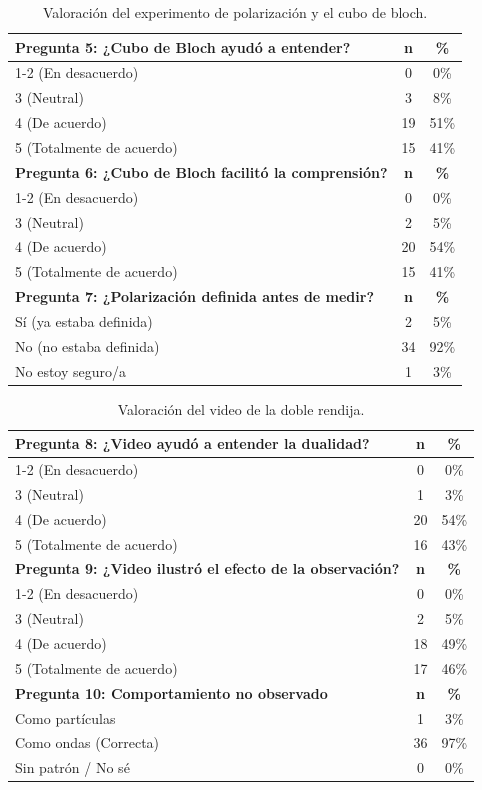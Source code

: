 \documentclass[10pt,a4paper]{article}
\begin{document}
\begin{table}[h!]
\centering
\caption{Valoración del experimento de polarización y el cubo de bloch.}
\begin{tabular}{|l|c|c|}
\hline
\textbf{Pregunta 5: ¿Cubo de Bloch ayudó a entender?} & \textbf{n} & \textbf{\%} \\
\hline
1-2 (En desacuerdo) & 0 & 0\% \\
3 (Neutral) & 3 & 8\% \\
4 (De acuerdo) & 19 & 51\% \\
5 (Totalmente de acuerdo) & 15 & 41\% \\
\hline
\textbf{Pregunta 6: ¿Cubo de Bloch facilitó la comprensión?} & \textbf{n} & \textbf{\%} \\
\hline
1-2 (En desacuerdo) & 0 & 0\% \\
3 (Neutral) & 2 & 5\% \\
4 (De acuerdo) & 20 & 54\% \\
5 (Totalmente de acuerdo) & 15 & 41\% \\
\hline
\textbf{Pregunta 7: ¿Polarización definida antes de medir?} & \textbf{n} & \textbf{\%} \\
\hline
Sí (ya estaba definida) & 2 & 5\% \\
No (no estaba definida) & 34 & 92\% \\
No estoy seguro/a & 1 & 3\% \\
\hline
\end{tabular}
\end{table}

\begin{table}[h!]
\centering
\caption{Valoración del video de la doble rendija.}
\begin{tabular}{|l|c|c|}
\hline
\textbf{Pregunta 8: ¿Video ayudó a entender la dualidad?} & \textbf{n} & \textbf{\%} \\
\hline
1-2 (En desacuerdo) & 0 & 0\% \\
3 (Neutral) & 1 & 3\% \\
4 (De acuerdo) & 20 & 54\% \\
5 (Totalmente de acuerdo) & 16 & 43\% \\
\hline
\textbf{Pregunta 9: ¿Video ilustró el efecto de la observación?} & \textbf{n} & \textbf{\%} \\
\hline
1-2 (En desacuerdo) & 0 & 0\% \\
3 (Neutral) & 2 & 5\% \\
4 (De acuerdo) & 18 & 49\% \\
5 (Totalmente de acuerdo) & 17 & 46\% \\
\hline
\textbf{Pregunta 10: Comportamiento no observado} & \textbf{n} & \textbf{\%} \\
\hline
Como partículas & 1 & 3\% \\
Como ondas (Correcta) & 36 & 97\% \\
Sin patrón / No sé & 0 & 0\% \\
\hline
\end{tabular}
\end{table}
\end{document}
